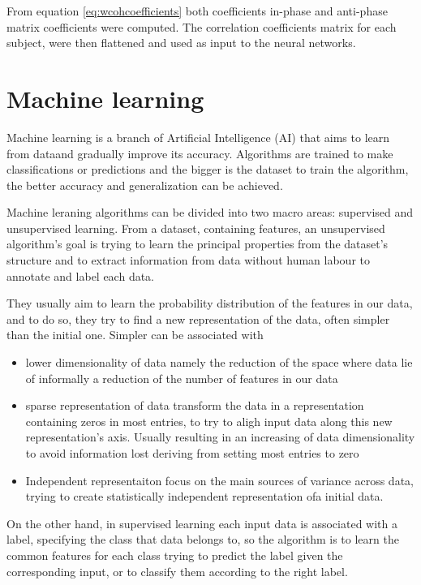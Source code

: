\documentclass[a4paper,11pt]{article}
\begin{document}
From equation \ref{eq:wcohcoefficients} both coefficients in-phase and anti-phase matrix coefficients were computed.
The correlation coefficients matrix for each subject, were then flattened and used as input to the neural networks.




\section{Machine learning}
Machine learning is a branch of Artificial Intelligence (AI) that aims to learn from dataand gradually improve its accuracy.
Algorithms are trained to make classifications or predictions and the bigger is the dataset to train the algorithm, the better accuracy and generalization can be achieved.

Machine leraning algorithms can be divided into two macro areas: supervised and unsupervised learning.
From a dataset, containing features, an unsupervised algorithm's goal is trying to learn the principal properties from the dataset's structure and to extract information from data without human labour to annotate and label each data.

They usually aim to learn the probability distribution of the features in our data, and to do so, they try to find a new representation of the data, often simpler than the initial one.
Simpler can be associated with
\begin{itemize}
\item lower dimensionality of data namely the reduction of the space where data lie of informally a reduction of the number of features in our data
\item sparse representation of data transform the data in a representation containing zeros in most entries, to try to aligh input data along this new  representation's axis. Usually resulting in an increasing of data dimensionality to avoid information lost deriving from setting most entries to zero
\item Independent representaiton focus on the main sources of variance across data, trying to create statistically independent representation ofa initial data.
\end{itemize}

On the other hand, in supervised learning each input data is associated with a label, specifying the class that data belongs to, so the algorithm is to learn the common features for each class trying to predict the label given the corresponding input, or to classify them according to the right label.
\end{document}
